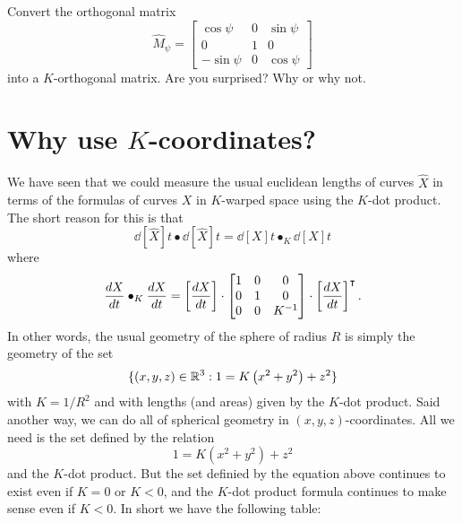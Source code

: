 \documentclass{ximera}
\begin{document}
\begin{problem}
  Convert the orthogonal matrix
  \[
  \hat{M}_\psi=\begin{bmatrix}
  \cos\psi & 0 & \sin\psi\\
  0 & 1 & 0\\
  -\sin\psi & 0 & \cos\psi
  \end{bmatrix}
  \]
  into a $K$-orthogonal matrix. Are you surprised? Why or why not.
\end{problem}

















\section{Why use $K$-coordinates?}

We have seen that we could measure the usual euclidean lengths of
curves $\hat{X}$ in terms of the formulas of curves $X$ in $K$-warped
space using the $K$-dot product. The short reason for this is that
\[
\dd[\hat{X}]{t}\bullet\dd[\hat{X}]{t}=\dd[X]{t}\bullet_{K}\dd[X]{t}
\]
where
\[
\dd[X]{t}\bullet_{K}\dd[X]{t}
=\left[\dd[X]{t}\right]\cdot\begin{bmatrix}
1 & 0 & 0\\
0 & 1 & 0\\
0 & 0 & K^{-1}%
\end{bmatrix}
\cdot\left[\dd[X]{t}\right]^\transpose.
\]
In other words, the usual geometry of the sphere of radius $R$ is
simply the geometry of the set
\[
\{(x,y,z)\in\mathbb R^3:1 = K\left(x^2 + y^2\right) +z^2\}
\]
with $K=1/R^{2}$ and with lengths (and areas) given by the $K$-dot
product. Said another way, we can do all of spherical geometry in
$(x,y,z)$-coordinates. All we need is the set defined by the relation
\[
1 = K\left(x^2 + y^2\right) +z^2
\]
and the $K$-dot product. But the set definied by the equation above
continues to exist even if $K=0$ or $K<0$, and the $K$-dot product
formula continues to make sense even if $K<0$. In short we have the
following table:
\end{document}
